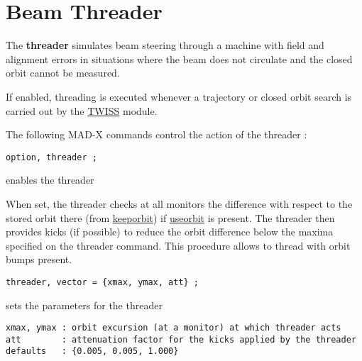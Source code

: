 
\section{Beam Threader} 
The \textbf{threader} simulates beam steering through a machine with
field and alignment errors in situations where the beam does not
circulate and the closed orbit cannot be measured.  

If enabled, threading is executed whenever a trajectory or closed orbit
search is carried out by the \href{../twiss/twiss.html}{TWISS} module.  

The following MAD-X commands control the action of the threader :   
\begin{verbatim}
option, threader ;
\end{verbatim}  
enables the threader 

When set, the threader checks at all monitors the difference with
respect to the stored orbit there (from
\href{../twiss/twiss.html}{keeporbit}) if
\href{../twiss/twiss.html}{useorbit} is present. The threader then
provides kicks (if possible) to reduce the orbit difference below the
maxima specified on the threader command. This procedure allows to
thread with orbit bumps present.   

\begin{verbatim}
threader, vector = {xmax, ymax, att} ;
\end{verbatim}  
sets the parameters for the threader 
\begin{verbatim}
xmax, ymax : orbit excursion (at a monitor) at which threader acts
att        : attenuation factor for the kicks applied by the threader
defaults   : {0.005, 0.005, 1.000}
\end{verbatim}


